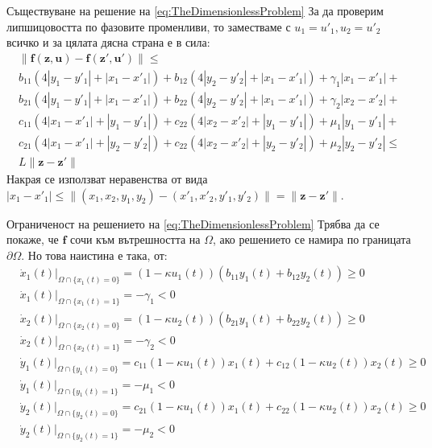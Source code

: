 \begin{frame}[t]{Съществуване на решение на \ref{eq:TheDimensionlessProblem}}
  За да проверим липшицовостта по фазовите променливи, то заместваме с $u_1 = u'_1, u_2 = u'_2$ всичко и за цялата дясна страна е в сила:
  \begin{multline}
    \|\boldsymbol{f}(\boldsymbol{z}, \boldsymbol{u}) - \boldsymbol{f}(\boldsymbol{z}', \boldsymbol{u}')\| \leq \\
    b_{11} (4 |y_1 - y'_1| + |x_1 - x'_1|) +
    b_{12} (4 |y_2 - y'_2| + |x_1 - x'_1|) + \gamma_1 |x_1-x'_1| + \\
    b_{21} (4 |y_1 - y'_1| + |x_1 - x'_1|) +
    b_{22} (4 |y_2 - y'_2| + |x_1 - x'_1|) + \gamma_2 |x_2-x'_2| + \\
    c_{11} (4 |x_1 - x'_1| + |y_1 - y'_1|) +
    c_{22} (4 |x_2 - x'_2| + |y_1 - y'_1|) + \mu_1 |y_1 - y'_1| + \\
    c_{21} (4 |x_1 - x'_1| + |y_2 - y'_2|) +
    c_{22} (4 |x_2 - x'_2| + |y_2 - y'_2|) + \mu_2 |y_2 - y'_2| \leq \\
    L \|\boldsymbol{z} - \boldsymbol{z}'\|
  \end{multline}
  Накрая се използват неравенства от вида $|x_1-x'_1| \leq \|(x_1, x_2, y_1, y_2) - (x'_1, x'_2, y'_1, y'_2)\| = \|\boldsymbol{z} - \boldsymbol{z}'\|$.
\end{frame}

\begin{frame}[t]{Ограниченост на решението на \ref{eq:TheDimensionlessProblem}}
  Трябва да се покаже, че $\boldsymbol{f}$ сочи към вътрешността на $\Omega$, ако решението се намира по границата $\partial \Omega$. Но това наистина е така, от:
  \begin{equation}
    \begin{split}
      &\dot{x}_1(t)\vert_{\Omega \cap \{x_1(t)=0\}} = (1-\kappa u_1(t))(b_{11} y_1(t) + b_{12} y_2(t)) \geq 0 \\
      &\dot{x}_1(t)\vert_{\Omega \cap \{x_1(t)=1\}} = - \gamma_1 < 0 \\
      &\dot{x}_2(t)\vert_{\Omega \cap \{x_2(t)=0\}} = (1-\kappa u_2(t))(b_{21} y_1(t) + b_{22} y_2(t)) \geq 0 \\
      &\dot{x}_2(t)\vert_{\Omega \cap \{x_2(t)=1\}} = - \gamma_2 < 0 \\
      &\dot{y}_1(t)\vert_{\Omega \cap \{y_1(t)=0\}} = c_{11}(1-\kappa u_1(t)) x_1(t) + c_{12}(1-\kappa u_2(t)) x_2(t) \geq 0 \\
      &\dot{y}_1(t)\vert_{\Omega \cap \{y_1(t)=1\}} = - \mu_1 < 0 \\
      &\dot{y}_2(t)\vert_{\Omega \cap \{y_2(t)=0\}} = c_{21}(1-\kappa u_1(t)) x_1(t) + c_{22}(1-\kappa u_2(t)) x_2(t) \geq 0 \\
      &\dot{y}_2(t)\vert_{\Omega \cap \{y_2(t)=1\}} = - \mu_2 < 0
    \end{split}
  \end{equation}
\end{frame}

